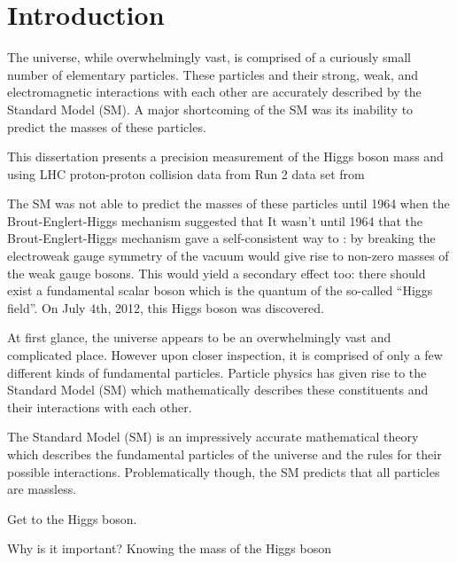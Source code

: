 \chapter{Introduction}

The universe, while overwhelmingly vast, is comprised of a curiously small number of elementary particles.
These particles and their strong, weak, and electromagnetic interactions with each other are accurately described by the Standard Model (SM).
A major shortcoming of the SM was its inability to predict the masses of these particles.

This dissertation presents a precision measurement of the Higgs boson mass and using LHC proton-proton collision data from Run 2  data set from  

The SM was not able to predict the masses of these particles until 1964 when the Brout-Englert-Higgs mechanism suggested that 
It wasn't until 1964 that the Brout-Englert-Higgs mechanism gave a self-consistent way to :
by breaking the electroweak gauge symmetry of the vacuum would give rise to non-zero masses of the weak gauge bosons.
This would yield a secondary effect too:
there should exist a fundamental scalar boson which is the quantum of the so-called ``Higgs field''.
On July 4th, 2012, this Higgs boson was discovered.

At first glance, the universe appears to be an overwhelmingly vast and complicated place.
However upon closer inspection, it is comprised of only a few different kinds of fundamental particles.
Particle physics has given rise to the Standard Model (SM) which mathematically describes these constituents and their interactions with each other.




The Standard Model (SM) is an impressively accurate mathematical theory which describes the fundamental particles of the universe and the rules for their possible interactions.
Problematically though, the SM predicts that all particles are massless.


Get to the Higgs boson.

Why is it important?
Knowing the mass of the Higgs boson 








